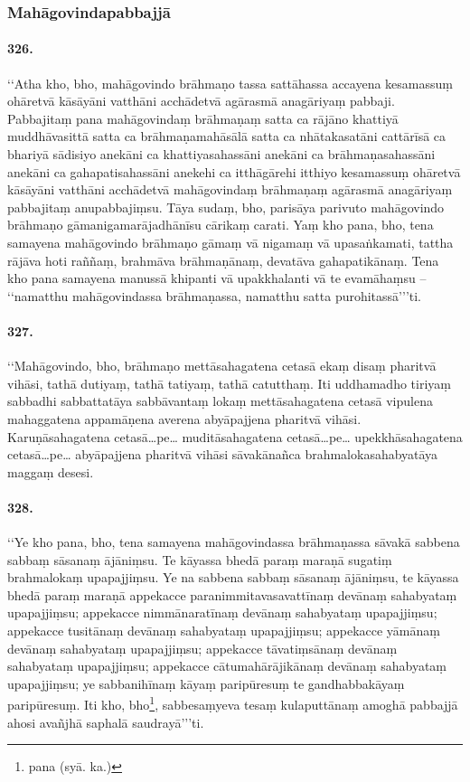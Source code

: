 \subsubsection{Mahāgovindapabbajjā}

\paragraph{326.} ‘‘Atha kho, bho, mahāgovindo brāhmaṇo tassa sattāhassa accayena kesamassuṃ ohāretvā kāsāyāni vatthāni acchādetvā agārasmā anagāriyaṃ pabbaji. Pabbajitaṃ pana mahāgovindaṃ brāhmaṇaṃ satta ca rājāno khattiyā muddhāvasittā satta ca brāhmaṇamahāsālā satta ca nhātakasatāni cattārīsā ca bhariyā sādisiyo anekāni ca khattiyasahassāni anekāni ca brāhmaṇasahassāni anekāni ca gahapatisahassāni anekehi ca itthāgārehi itthiyo kesamassuṃ ohāretvā kāsāyāni vatthāni acchādetvā mahāgovindaṃ brāhmaṇaṃ agārasmā anagāriyaṃ pabbajitaṃ anupabbajiṃsu. Tāya sudaṃ, bho, parisāya parivuto mahāgovindo brāhmaṇo gāmanigamarājadhānīsu cārikaṃ carati. Yaṃ kho pana, bho, tena samayena mahāgovindo brāhmaṇo gāmaṃ vā nigamaṃ vā upasaṅkamati, tattha rājāva hoti raññaṃ, brahmāva brāhmaṇānaṃ, devatāva gahapatikānaṃ. Tena kho pana samayena manussā khipanti vā upakkhalanti vā te evamāhaṃsu – ‘‘namatthu mahāgovindassa brāhmaṇassa, namatthu satta purohitassā’’’ti.

\paragraph{327.} ‘‘Mahāgovindo, bho, brāhmaṇo mettāsahagatena cetasā ekaṃ disaṃ pharitvā vihāsi, tathā dutiyaṃ, tathā tatiyaṃ, tathā catutthaṃ. Iti uddhamadho tiriyaṃ sabbadhi sabbattatāya sabbāvantaṃ lokaṃ mettāsahagatena cetasā vipulena mahaggatena appamāṇena averena abyāpajjena pharitvā vihāsi. Karuṇāsahagatena cetasā…pe… muditāsahagatena cetasā…pe… upekkhāsahagatena cetasā…pe… abyāpajjena pharitvā vihāsi sāvakānañca brahmalokasahabyatāya maggaṃ desesi.

\paragraph{328.} ‘‘Ye kho pana, bho, tena samayena mahāgovindassa brāhmaṇassa sāvakā sabbena sabbaṃ sāsanaṃ ājāniṃsu. Te kāyassa bhedā paraṃ maraṇā sugatiṃ brahmalokaṃ upapajjiṃsu. Ye na sabbena sabbaṃ sāsanaṃ ājāniṃsu, te kāyassa bhedā paraṃ maraṇā appekacce paranimmitavasavattīnaṃ devānaṃ sahabyataṃ upapajjiṃsu; appekacce nimmānaratīnaṃ devānaṃ sahabyataṃ upapajjiṃsu; appekacce tusitānaṃ devānaṃ sahabyataṃ upapajjiṃsu; appekacce yāmānaṃ devānaṃ sahabyataṃ upapajjiṃsu; appekacce tāvatiṃsānaṃ devānaṃ sahabyataṃ upapajjiṃsu; appekacce cātumahārājikānaṃ devānaṃ sahabyataṃ upapajjiṃsu; ye sabbanihīnaṃ kāyaṃ paripūresuṃ te gandhabbakāyaṃ paripūresuṃ. Iti kho, bho\footnote{pana (syā. ka.)}, sabbesaṃyeva tesaṃ kulaputtānaṃ amoghā pabbajjā ahosi avañjhā saphalā saudrayā’’’ti.

